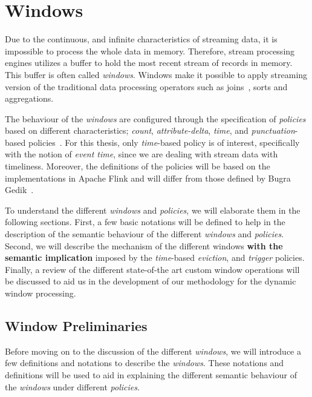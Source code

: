\chapter{Windows}
\label{chap:windows}

Due to the continuous, and infinite characteristics of streaming data, 
it is impossible to process the whole data in memory. Therefore, 
stream processing engines utilizes a buffer to hold the most recent stream of 
records in memory. This buffer is often called \emph{windows}. Windows make it 
possible to apply streaming version of the traditional data processing operators such
as joins~\cite{grubjoin}, sorts and aggregations. 

The behaviour of the \emph{windows} are configured through the specification of \emph{policies}
based on different characteristics; \emph{count}, \emph{attribute-delta}, \emph{time}, and
\emph{punctuation}-based policies~\cite{generic_window_sem}. For this thesis, only 
\emph{time}-based policy is of interest, specifically with the notion of \emph{event time},
since we are dealing with stream data with 
timeliness. Moreover, the definitions of the policies will be based on the 
implementations in Apache Flink and will differ from those defined by 
Bugra Gedik~\cite{generic_window_sem}. 


To understand the different \emph{windows} and \emph{policies}, we will elaborate them 
in the following sections. First, a few basic notations will be defined to 
help in the description of the semantic behaviour of the different 
\emph{windows} and \emph{policies}. Second, we will describe the mechanism of the 
different windows \textbf{with the semantic implication} imposed by the 
\emph{time}-based \emph{eviction}, and \emph{trigger} policies. 
Finally, a review of the different state-of-the art custom window operations 
will be discussed to aid us in the development of our methodology for 
the dynamic window processing. 


\section{Window Preliminaries}%
\label{sec:window_notations}

Before moving on to the discussion of the different \emph{windows}, we will introduce a 
few definitions and notations to describe the \emph{windows}. These notations and definitions 
will be used to aid in explaining the different semantic behaviour of the \emph{windows} under 
different \emph{policies}. 

